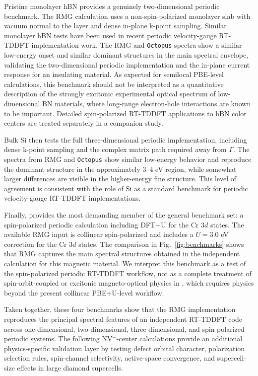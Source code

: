 Pristine monolayer hBN provides a genuinely two-dimensional periodic
benchmark.  The RMG calculation uses a non-spin-polarized monolayer
slab with vacuum normal to the layer and dense in-plane k-point
sampling.  Similar monolayer hBN tests have been used in recent
periodic velocity-gauge RT-TDDFT implementation
work.\cite{Hanasaki-2023}  The RMG and \texttt{Octopus} spectra show
a similar low-energy onset and similar dominant structures in the main
spectral envelope, validating the two-dimensional periodic
implementation and the in-plane current response for an insulating
material.  As expected for semilocal PBE-level calculations, this
benchmark should not be interpreted as a quantitative description of
the strongly excitonic experimental optical spectrum of
low-dimensional BN materials, where long-range electron-hole
interactions are known to be important.\cite{Wirtz-BN-excitons-2006}
Detailed spin-polarized RT-TDDFT applications to hBN color centers are
treated separately in a companion study.

Bulk Si then tests the full three-dimensional periodic implementation,
including dense k-point sampling and the complex matrix path required
away from $\Gamma$.  The spectra from RMG and \texttt{Octopus} show
similar low-energy behavior and reproduce the dominant structure in
the approximately 3--4 eV region, while somewhat larger differences
are visible in the higher-energy fine structure.  This level of
agreement is consistent with the role of Si as a standard benchmark
for periodic velocity-gauge RT-TDDFT
implementations.\cite{Hekele-2021}

Finally,  provides the most demanding member of the general
benchmark set: a spin-polarized periodic calculation including DFT+U
for the Cr $3d$ states.  The available RMG input is collinear
spin-polarized and includes a $U=3.0$ eV correction for the Cr $3d$
states.  The comparison in Fig.~\ref{fig:benchmarks} shows that RMG
captures the main spectral structures obtained in the independent
calculation for this magnetic material.  We interpret this benchmark
as a test of the spin-polarized periodic RT-TDDFT workflow, not as a
complete treatment of spin-orbit-coupled or excitonic
magneto-optical physics in , which requires physics beyond
the present collinear PBE+U-level
workflow.\cite{Wu-CrI3-excitons-2019}

Taken together, these four benchmarks show that the RMG implementation
reproduces the principal spectral features of an independent RT-TDDFT
code across one-dimensional, two-dimensional, three-dimensional, and
spin-polarized periodic systems.  The following NV$^{-}$-center
calculations provide an additional physics-specific validation layer by
testing defect orbital character, polarization selection rules,
spin-channel selectivity, active-space convergence, and supercell-size
effects in large diamond supercells.
